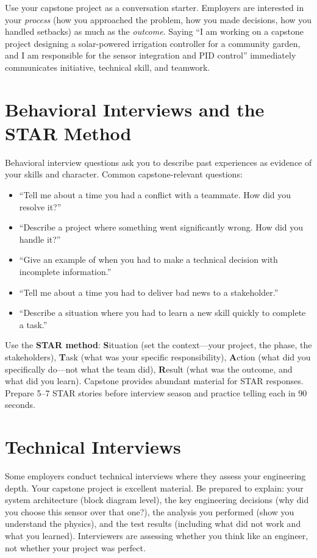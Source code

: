 Use your capstone project as a conversation starter. Employers are interested in your \emph{process} (how you approached the problem, how you made decisions, how you handled setbacks) as much as the \emph{outcome}. Saying ``I am working on a capstone project designing a solar-powered irrigation controller for a community garden, and I am responsible for the sensor integration and PID control'' immediately communicates initiative, technical skill, and teamwork.

\section{Behavioral Interviews and the STAR Method}
Behavioral interview questions ask you to describe past experiences as evidence of your skills and character. Common capstone-relevant questions:

\begin{itemize}[nosep,leftmargin=1.5em]
\item ``Tell me about a time you had a conflict with a teammate. How did you resolve it?''
\item ``Describe a project where something went significantly wrong. How did you handle it?''
\item ``Give an example of when you had to make a technical decision with incomplete information.''
\item ``Tell me about a time you had to deliver bad news to a stakeholder.''
\item ``Describe a situation where you had to learn a new skill quickly to complete a task.''
\end{itemize}

Use the \textbf{STAR method}: \textbf{S}ituation (set the context---your project, the phase, the stakeholders), \textbf{T}ask (what was your specific responsibility), \textbf{A}ction (what did you specifically do---not what the team did), \textbf{R}esult (what was the outcome, and what did you learn). Capstone provides abundant material for STAR responses. Prepare 5--7 STAR stories before interview season and practice telling each in 90 seconds.

\section{Technical Interviews}
Some employers conduct technical interviews where they assess your engineering depth. Your capstone project is excellent material. Be prepared to explain: your system architecture (block diagram level), the key engineering decisions (why did you choose this sensor over that one?), the analysis you performed (show you understand the physics), and the test results (including what did not work and what you learned). Interviewers are assessing whether you think like an engineer, not whether your project was perfect.

